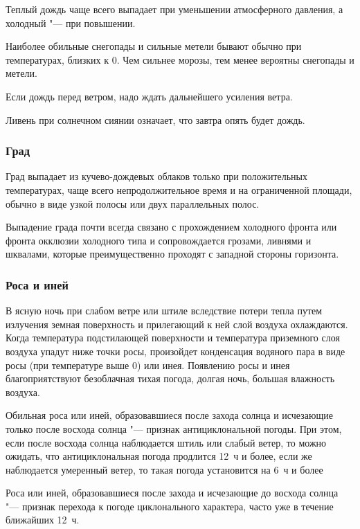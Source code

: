  Теплый дождь чаще всего выпадает при уменьшении атмосферного
давления, а холодный "--- при повышении.

 Наиболее обильные снегопады и сильные метели бывают обычно при
температурах, близких к 0\gr. Чем сильнее морозы, тем менее вероятны
снегопады и метели.

 Если дождь перед ветром, надо ждать дальнейшего усиления ветра.

 Ливень при солнечном сиянии означает, что завтра опять будет дождь.

\subsubsection{Град}

Град выпадает из кучево-дождевых облаков только при положительных
температурах, чаще всего непродолжительное время и на ограниченной
площади, обычно в виде узкой полосы или двух параллельных полос.

 Выпадение града почти всегда связано с прохождением холодного
фронта или фронта окклюзии холодного типа и сопровождается грозами,
ливнями и шквалами, которые преимущественно проходят с западной
стороны горизонта.

\subsubsection{Роса и иней}

В ясную ночь при слабом ветре или штиле вследствие потери тепла путем
излучения земная поверхность и прилегающий к ней слой воздуха
охлаждаются. Когда температура подстилающей поверхности и температура
приземного слоя воздуха упадут ниже точки росы, произойдет конденсация
водяного пара в виде росы (при температуре выше 0\gr) или инея. Появлению
росы и инея благоприятствуют безоблачная тихая погода, долгая ночь,
большая влажность воздуха.

 Обильная роса или иней, образовавшиеся после захода солнца и
исчезающие только после восхода солнца "--- признак антициклональной
погоды. При этом, если после восхода солнца наблюдается штиль или
слабый ветер, то можно ожидать, что антициклональная погода продлится
12~ч и более, если же наблюдается умеренный ветер, то такая погода
установится на 6~ч и более

 Роса или иней, образовавшиеся после захода и исчезающие до
восхода солнца "--- признак перехода к погоде циклонального характера,
часто уже в течение ближайших 12~ч.

